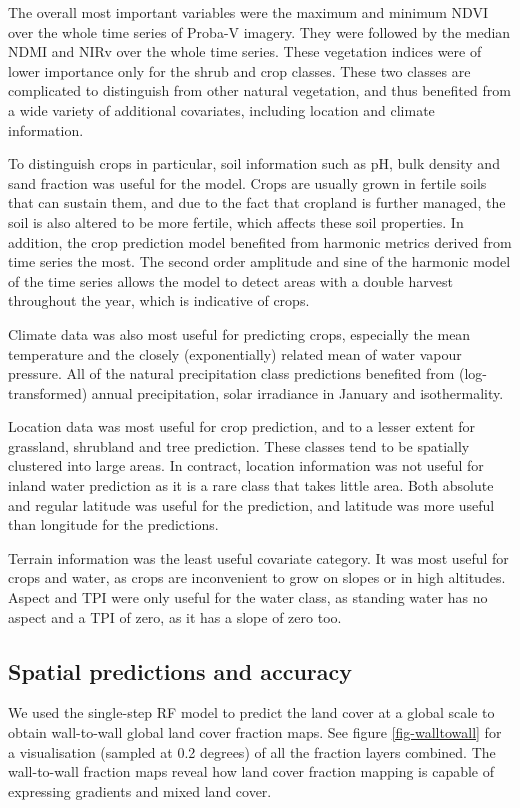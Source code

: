 \documentclass[review,authoryear,3p]{elsarticle}
\begin{document}
The overall most important variables were the maximum and minimum NDVI over the whole time series of Proba-V imagery.
They were followed by the median NDMI and NIRv over the whole time series.
These vegetation indices were of lower importance only for the shrub and crop classes.
These two classes are complicated to distinguish from other natural vegetation, and thus benefited from a wide variety of additional covariates, including location and climate information.

To distinguish crops in particular, soil information such as pH, bulk density and sand fraction was useful for the model.
Crops are usually grown in fertile soils that can sustain them, and due to the fact that cropland is further managed, the soil is also altered to be more fertile, which affects these soil properties.
In addition, the crop prediction model benefited from harmonic metrics derived from time series the most.
The second order amplitude and sine of the harmonic model of the time series allows the model to detect areas with a double harvest throughout the year, which is indicative of crops.

Climate data was also most useful for predicting crops, especially the mean temperature and the closely (exponentially) related mean of water vapour pressure.
All of the natural precipitation class predictions benefited from (log-transformed) annual precipitation, solar irradiance in January and isothermality.

Location data was most useful for crop prediction, and to a lesser extent for grassland, shrubland and tree prediction.
These classes tend to be spatially clustered into large areas.
In contract, location information was not useful for inland water prediction as it is a rare class that takes little area.
Both absolute and regular latitude was useful for the prediction, and latitude was more useful than longitude for the predictions.

Terrain information was the least useful covariate category.
It was most useful for crops and water, as crops are inconvenient to grow on slopes or in high altitudes.
Aspect and \gls{TPI} were only useful for the water class, as standing water has no aspect and a \gls{TPI} of zero, as it has a slope of zero too.

\subsection{Spatial predictions and accuracy}

We used the single-step \gls{RF} model to predict the land cover at a global scale to obtain wall-to-wall global land cover fraction maps.
See figure \ref{fig-walltowall} for a visualisation (sampled at 0.2 degrees) of all the fraction layers combined.
The wall-to-wall fraction maps reveal how land cover fraction mapping is capable of expressing gradients and mixed land cover.
\end{document}

